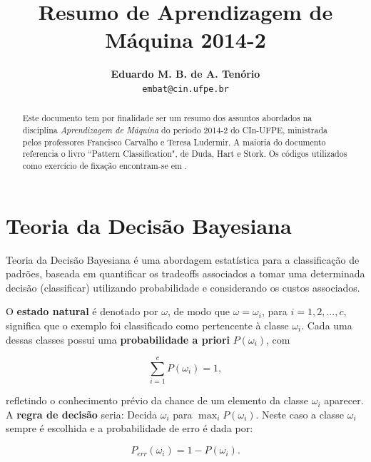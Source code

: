\documentclass[a4paper,12pt,twocolumn]{article}
\begin{document}
\title{\textbf{Resumo de Aprendizagem de Máquina 2014-2}}
\author{
    \textbf{Eduardo M. B. de A. Tenório}\\
    \small{\texttt{embat@cin.ufpe.br}}
}
\date{}

\maketitle


\begin{abstract}
\begin{itshape}
Este documento tem por finalidade ser um resumo dos assuntos abordados na disciplina \emph{Aprendizagem de Máquina} do período 2014-2 do CIn-UFPE, ministrada pelos professores Francisco Carvalho e Teresa Ludermir. A maioria do documento referencia o livro ``Pattern Classification", de Duda, Hart e Stork. Os códigos utilizados como exercício de fixação encontram-se em .
\end{itshape}
\end{abstract}


\section{Teoria da Decisão Bayesiana}

Teoria da Decisão Bayesiana é uma abordagem estatística para a classificação de
padrões, baseada em quantificar os tradeoffs associados a tomar uma determinada
decisão (classificar) utilizando probabilidade e considerando os custos associados.

O \textbf{estado natural} é denotado por $\omega$, de modo que $\omega = \omega_i$, para $i = 1, 2, ..., c$, significa que o exemplo foi classificado como pertencente à classe $\omega_i$. Cada uma dessas classes possui uma \textbf{probabilidade a priori} $P(\omega_i)$, com

\begin{equation}
    \sum_{i=1}^{c} P(\omega_i) = 1,
    \label{eq:sum_priori_prob_to_one}
\end{equation}

\noindent refletindo o conhecimento prévio da chance de um elemento da classe $\omega_i$ aparecer. A \textbf{regra de decisão} seria: Decida $\omega_i$ para $\max_i P(\omega_i)$. Neste caso a classe $\omega_i$ sempre é escolhida e a probabilidade de erro é dada por:

\begin{equation}
    P_{err}(\omega_i) = 1 - P(\omega_i).
    \label{eq:prob_i_error}
\end{equation}
\end{document}
